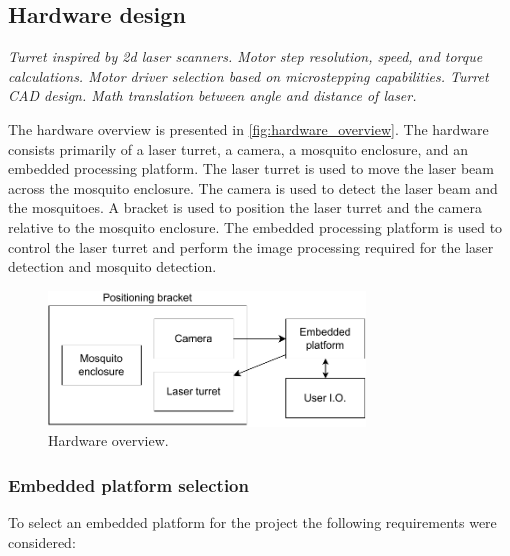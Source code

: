 \subsection{Hardware design}
\textit{Turret inspired by 2d laser scanners. Motor step resolution, speed, and torque calculations. Motor driver selection based on microstepping capabilities. Turret CAD design. Math translation between angle and distance of laser.}

The hardware overview is presented in \autoref{fig:hardware_overview}. The hardware consists primarily of a laser turret, a camera, a mosquito enclosure, and an embedded processing platform. The laser turret is used to move the laser beam across the mosquito enclosure. The camera is used to detect the laser beam and the mosquitoes. A bracket is used to position the laser turret and the camera relative to the mosquito enclosure. The embedded processing platform is used to control the laser turret and perform the image processing required for the laser detection and mosquito detection.

\begin{figure}[h]
    \centering
    \includegraphics[width=0.75\textwidth]{figures/hardware_design/hardware_overview.pdf}
    \caption{Hardware overview.}
    \label{fig:hardware_overview}
\end{figure}



\subsubsection{Embedded platform selection}
To select an embedded platform for the project the following requirements were considered:

